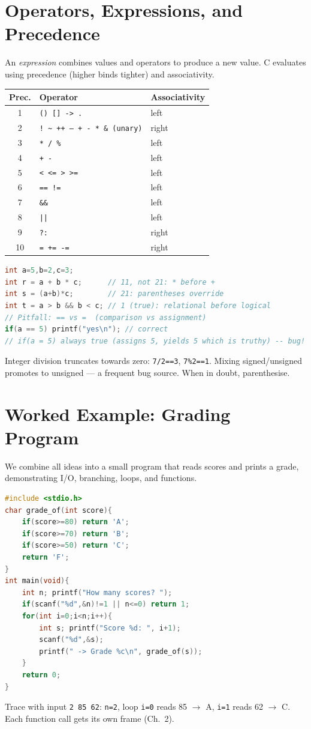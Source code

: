 \section{Operators, Expressions, and Precedence}
An \emph{expression} combines values and operators to produce a new value. C evaluates using precedence (higher binds tighter) and associativity.

\begin{center}\small
\begin{tabular}{cll}
\toprule Prec. & Operator & Associativity\\
\midrule 1 & \texttt{() [] -> .} & left\\
2 & \texttt{! \~{} ++ -- + - * \& (unary)} & right\\
3 & \texttt{* / \%} & left\\
4 & \texttt{+ -} & left\\
5 & \texttt{< <= > >=} & left\\
6 & \texttt{== !=} & left\\
7 & \texttt{\&\&} & left\\
8 & \texttt{||} & left\\
9 & \texttt{?:} & right\\
10& \texttt{= += -=} & right\\
\bottomrule
\end{tabular}
\end{center}
\begin{lstlisting}[language=C]
int a=5,b=2,c=3;
int r = a + b * c;      // 11, not 21: * before +
int s = (a+b)*c;        // 21: parentheses override
int t = a > b && b < c; // 1 (true): relational before logical
// Pitfall: == vs =  (comparison vs assignment)
if(a == 5) printf("yes\n"); // correct
// if(a = 5) always true (assigns 5, yields 5 which is truthy) -- bug!
\end{lstlisting}
Integer division truncates towards zero: \texttt{7/2==3}, \texttt{7\%2==1}. Mixing signed/unsigned promotes to unsigned --- a frequent bug source. When in doubt, parenthesise.

\section{Worked Example: Grading Program}
We combine all ideas into a small program that reads scores and prints a grade, demonstrating I/O, branching, loops, and functions.

\begin{lstlisting}[language=C]
#include <stdio.h>
char grade_of(int score){
    if(score>=80) return 'A';
    if(score>=70) return 'B';
    if(score>=50) return 'C';
    return 'F';
}
int main(void){
    int n; printf("How many scores? ");
    if(scanf("%d",&n)!=1 || n<=0) return 1;
    for(int i=0;i<n;i++){
        int s; printf("Score %d: ", i+1);
        scanf("%d",&s);
        printf(" -> Grade %c\n", grade_of(s));
    }
    return 0;
}
\end{lstlisting}
Trace with input \texttt{2 85 62}: \texttt{n=2}, loop \texttt{i=0} reads 85 $\to$ A, \texttt{i=1} reads 62 $\to$ C. Each function call gets its own frame (Ch.~2).

